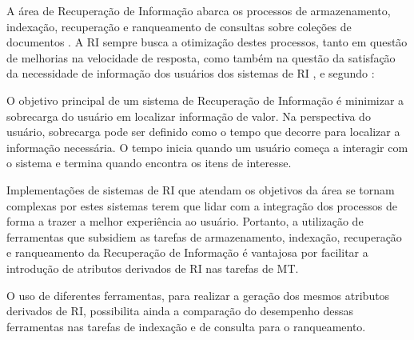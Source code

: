     
    A área de Recuperação de Informação abarca os processos de armazenamento, indexação, recuperação e ranqueamento de consultas sobre coleções de documentos \cite[p.~5--8]{Baeza-Yates2011}.
    A RI sempre busca a otimização destes processos, tanto em questão de melhorias na velocidade de resposta, como também na questão da satisfação da necessidade de informação dos usuários dos sistemas de RI \cite[p~.671--672]{Sammut2017EMLDM}, e segundo :
    
    \begin{citacao}
        O objetivo principal de um sistema de Recuperação de Informação é minimizar a sobrecarga do usuário em localizar informação de valor. 
        Na perspectiva do usuário, sobrecarga pode ser definido como o tempo que decorre para localizar a informação necessária.
        O tempo inicia quando um usuário começa a interagir com o sistema e termina quando encontra os itens de interesse.
    \end{citacao}
    Implementações de sistemas de RI que atendam os objetivos da área se tornam complexas por estes sistemas terem que lidar com a integração dos processos de forma a trazer a melhor experiência ao usuário.
    Portanto, a utilização de ferramentas que subsidiem as tarefas de armazenamento, indexação, recuperação e ranqueamento da Recuperação de Informação é vantajosa por facilitar a introdução de atributos derivados de RI nas tarefas de MT.
   
    O uso de diferentes ferramentas, para realizar a geração dos mesmos atributos derivados de RI, possibilita ainda a comparação do desempenho dessas ferramentas nas tarefas de indexação e de consulta para o ranqueamento.
    
